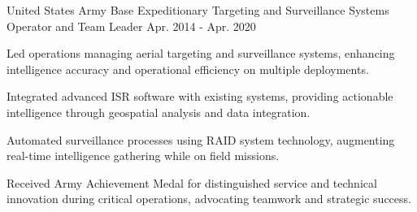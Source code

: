 \begin{cventries}
  \cventry
    {United States Army} %
    {Base Expeditionary Targeting and Surveillance Systems Operator and Team Leader} %
    {} %
    {Apr. 2014 - Apr. 2020} %
    {
      \begin{cvitems} %
      \item {Led operations managing aerial targeting and surveillance systems, enhancing intelligence accuracy and operational efficiency on multiple deployments.}
    \item {Integrated advanced ISR software with existing systems, providing actionable intelligence through geospatial analysis and data integration.}
    \item {Automated surveillance processes using RAID system technology, augmenting real-time intelligence gathering while on field missions.}
    \item {Received Army Achievement Medal for distinguished service and technical innovation during critical operations, advocating teamwork and strategic success.}
      \end{cvitems}
    }
\end{cventries}
